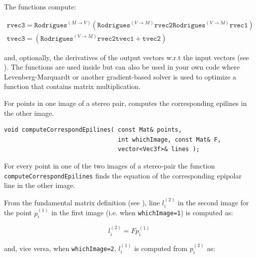 \begin{description}
The functions compute:

\[ \begin{array}{l}
\texttt{rvec3} = \texttt{Rodrigues}^{(M \rightarrow V)}
    (\texttt{Rodrigues}^{(V \rightarrow M)}{\texttt{rvec2}} \texttt{Rodrigues}^{(V \rightarrow M)}{\texttt{rvec1}}) \\
\texttt{tvec3} = (\texttt{Rodrigues}^{(V \rightarrow M)}{\texttt{rvec2}} \texttt{tvec1} + \texttt{tvec2})
\end{array} \]

and, optionally, the derivatives of the output vectors w.r.t the input vectors (see ).
The functions are used inside  but can also be used in your own code where Levenberg-Marquardt or another gradient-based solver is used to optimize a function that contains matrix multiplication.


\label{computeCorrespondEpilines}
For points in one image of a stereo pair, computes the corresponding epilines in the other image.

\begin{lstlisting}
void computeCorrespondEpilines( const Mat& points,
                                int whichImage, const Mat& F,
                                vector<Vec3f>& lines );
\end{lstlisting}
\begin{description}
\end{description}

For every point in one of the two images of a stereo-pair the function
\texttt{computeCorrespondEpilines} finds the equation of the
corresponding epipolar line in the other image.

From the fundamental matrix definition (see ),
line $l^{(2)}_i$ in the second image for the point $p^{(1)}_i$ in the first image (i.e. when \texttt{whichImage=1}) is computed as:

\[ l^{(2)}_i = F p^{(1)}_i \]

and, vice versa, when \texttt{whichImage=2}, $l^{(1)}_i$ is computed from $p^{(2)}_i$ as:


\end{description}
